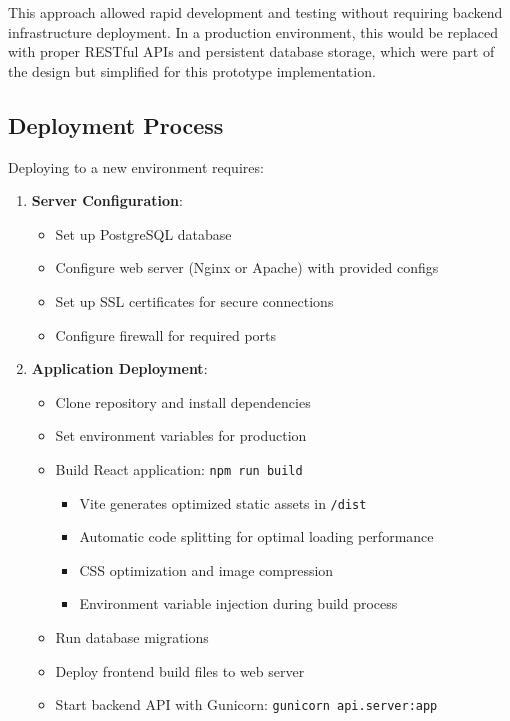 \documentclass[12pt]{article}
\begin{document}
This approach allowed rapid development and testing without requiring backend infrastructure deployment. In a production environment, this would be replaced with proper RESTful APIs and persistent database storage, which were part of the design but simplified for this prototype implementation.

\subsection{Deployment Process}

Deploying to a new environment requires:

\begin{enumerate}
    \item \textbf{Server Configuration}:
    \begin{itemize}
        \item Set up PostgreSQL database
        \item Configure web server (Nginx or Apache) with provided configs
        \item Set up SSL certificates for secure connections
        \item Configure firewall for required ports
    \end{itemize}
    
    \item \textbf{Application Deployment}:
    \begin{itemize}
        \item Clone repository and install dependencies
        \item Set environment variables for production
        \item Build React application: \texttt{npm run build}
          \begin{itemize}
              \item Vite generates optimized static assets in \texttt{/dist}
              \item Automatic code splitting for optimal loading performance
              \item CSS optimization and image compression
              \item Environment variable injection during build process
          \end{itemize}
        \item Run database migrations
        \item Deploy frontend build files to web server
        \item Start backend API with Gunicorn: \texttt{gunicorn api.server:app}
    \end{itemize}
    

\end{enumerate}
\end{document}
